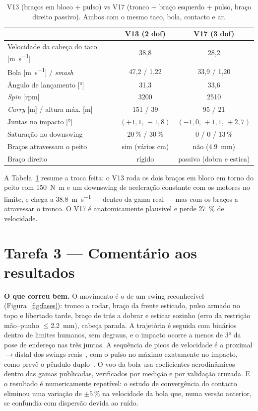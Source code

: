 \documentclass[11pt,a4paper]{article}
\begin{document}
\begin{table}[h]
\centering
\caption{V13 (braços em bloco + pulso) vs V17 (tronco + braço esquerdo + pulso,
braço direito passivo). Ambos com o mesmo taco, bola, contacto e ar.}
\label{tab:v13v17}
\small
\begin{tabular}{lcc}
\toprule
 & V13 (2 dof) & V17 (3 dof) \\
\midrule
Velocidade da cabeça do taco [\si{\meter\per\second}] & 38,8 & 28,2 \\
Bola [\si{\meter\per\second}] / \emph{smash} & 47,2 / 1,22 & 33,9 / 1,20 \\
Ângulo de lançamento [\si{\degree}] & 31,3 & 33,6 \\
\emph{Spin} [rpm] & 3200 & 2510 \\
\emph{Carry} [\si{\meter}] / altura máx. [\si{\meter}] & 151 / 39 & 95 / 21 \\
Juntas no impacto [\si{\degree}] & $(+1{,}1,\,-1{,}8)$ & $(-1{,}0,\,+1{,}1,\,+2{,}7)$ \\
Saturação no downswing & 20\,\% / 30\,\% & 0 / 0 / 13\,\% \\
Braços atravessam o peito & sim (vários cm) & não (\SI{4.9}{\milli\meter}) \\
Braço direito & rígido & passivo (dobra e estica) \\
\bottomrule
\end{tabular}
\end{table}

A Tabela~\ref{tab:v13v17} resume a troca feita: o V13 roda os dois braços em
bloco em torno do peito com \SI{150}{\newton\meter} e um downswing de
aceleração constante com os motores no limite, e chega a
\SI{38.8}{\meter\per\second} --- dentro da gama real --- mas com os braços a
atravessar o tronco. O V17 é anatomicamente plausível e perde
\SI{27}{\percent} de velocidade.

\section{Tarefa 3 --- Comentário aos resultados}
\label{sec:comentario}

\textbf{O que correu bem.} O movimento é o de um swing reconhecível
(Figura~\ref{fig:fases}): tronco a rodar, braço da frente esticado, pulso
armado no topo e libertado tarde, braço de trás a dobrar e esticar sozinho
(erro da restrição mão--punho $\leq$\SI{2.2}{\milli\meter}), cabeça parada. A
trajetória é seguida com binários dentro de limites humanos, sem degraus, e o
impacto ocorre a menos de \ang{3} da pose de endereço nas três juntas. A
sequência de picos de velocidade é a proximal$\to$distal dos swings
reais~\cite{hume2005}, com o pulso no máximo exatamente no impacto, como prevê
o pêndulo duplo~\cite{jorgensen1970,pickering1999}. O voo da bola usa
coeficientes aerodinâmicos dentro das gamas publicadas, verificados por
medição e por validação cruzada. E o resultado é numericamente repetível: o
estudo de convergência do contacto eliminou uma variação de $\pm5\,\%$ na
velocidade da bola que, numa versão anterior, se confundia com dispersão
devida ao ruído.
\end{document}
